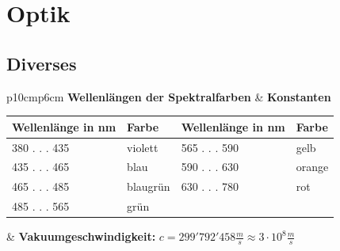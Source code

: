 \section{Optik}

\subsection{Diverses}
\begin{tabular}{p{10cm}p{6cm}}
  \textbf{Wellenlängen der Spektralfarben} & \textbf{Konstanten} \\
  \begin{tabular}{|l|l|l|l|}
    \hline
      Wellenlänge in nm & Farbe & Wellenlänge in nm & Farbe \\
      \hline
      380 . . . 435 & violett  & 565 . . . 590 & gelb \\
      435 . . . 465 & blau     & 590 . . . 630 & orange \\
      465 . . . 485 & blaugrün & 630 . . . 780 & rot \\
      485 . . . 565 & grün & & \\
      \hline
  \end{tabular}
  & \textbf{Vakuumgeschwindigkeit:} \newline 
  $c=299'792'458 \frac{m}{s} \approx 3 \cdot 10^8 \frac{m}{s}$ \\
\end{tabular}

